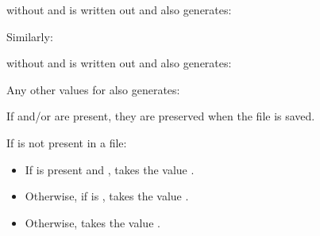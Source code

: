 \documentclass[letterpaper,12pt,english,openany,oneside]{sphinxmanual}
\begin{document}
\begin{sphinxVerbatim}[commandchars=\\\{\}]
 \PYG{p}{[}  \PYG{p}{]}
\end{sphinxVerbatim}

without  and  is written out and also generates:

\begin{sphinxVerbatim}[commandchars=\\\{\}]
 
 
\end{sphinxVerbatim}

Similarly:

\begin{sphinxVerbatim}[commandchars=\\\{\}]
 \PYG{p}{[}  \PYG{p}{]}
\end{sphinxVerbatim}

without  and  is written out and also generates:

\begin{sphinxVerbatim}[commandchars=\\\{\}]
 
 
\end{sphinxVerbatim}

Any other values for  also generates:

\begin{sphinxVerbatim}[commandchars=\\\{\}]
 
 
\end{sphinxVerbatim}

If  and/or  are present, they are preserved when the file is saved.

If  is not present in a file:
\begin{itemize}
\item {} 
If  is present and  ,  takes the value \sphinxcode{\sphinxupquote{{[}/PDFX1a:2001{]}}} .

\item {} 
Otherwise, if  is  ,  takes the value \sphinxcode{\sphinxupquote{{[}/PDFX3:2002{]}}} .

\item {} 
Otherwise,  takes the value \sphinxcode{\sphinxupquote{{[}/None{]}}} .

\end{itemize}
\end{document}

